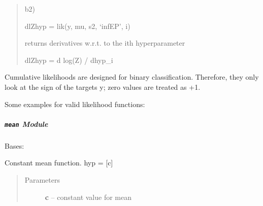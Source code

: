 \documentclass[letterpaper,10pt,english]{sphinxmanual}
\begin{document}
\begin{fulllineitems}
\begin{fulllineitems}
\begin{quote}
\begin{DUlineblock}{0em}
\item[] b2)
\item[] dlZhyp = lik(y, mu, s2, `infEP', i)
\item[] returns derivatives w.r.t. to the ith hyperparameter 
\item[] dlZhyp = d log(Z) / dhyp\_i 
\end{DUlineblock}
\end{quote}

Cumulative likelihoods are designed for binary classification. Therefore, they
only look at the sign of the targets y; zero values are treated as +1.
\begin{description}
\item[{Some examples for valid likelihood functions:}] \leavevmode
{}

\end{description}

\end{fulllineitems}


\end{fulllineitems}



\subparagraph{\texttt{mean} Module}
\label{pyGPs.Core:module-pyGPs.Core.mean}\label{pyGPs.Core:mean-module}

\begin{fulllineitems}
\label{pyGPs.Core:pyGPs.Core.mean.Const}
Bases: {\hyperref[pyGPs.Core:pyGPs.Core.mean.Mean]{}}

Constant mean function. hyp = {[}c{]}
\begin{quote}\begin{description}
\item[{Parameters}] \leavevmode
\textbf{c} -- constant value for mean

\end{description}\end{quote}

\begin{fulllineitems}
\label{pyGPs.Core:pyGPs.Core.mean.Const.getDerMatrix}
\end{fulllineitems}


\begin{fulllineitems}
\label{pyGPs.Core:pyGPs.Core.mean.Const.getMean}
\end{fulllineitems}


\end{fulllineitems}
\end{document}
